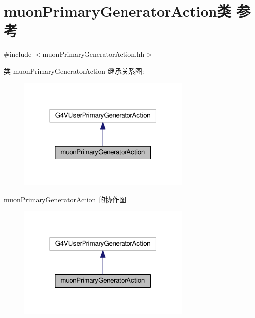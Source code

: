 \hypertarget{classmuonPrimaryGeneratorAction}{}\section{muon\+Primary\+Generator\+Action类 参考}
\label{classmuonPrimaryGeneratorAction}


{\ttfamily \#include $<$muon\+Primary\+Generator\+Action.\+hh$>$}



类 muon\+Primary\+Generator\+Action 继承关系图\+:\nopagebreak
\begin{figure}[H]
\begin{center}
\leavevmode
\includegraphics[width=241pt]{classmuonPrimaryGeneratorAction__inherit__graph}
\end{center}
\end{figure}


muon\+Primary\+Generator\+Action 的协作图\+:\nopagebreak
\begin{figure}[H]
\begin{center}
\leavevmode
\includegraphics[width=241pt]{classmuonPrimaryGeneratorAction__coll__graph}
\end{center}
\end{figure}
